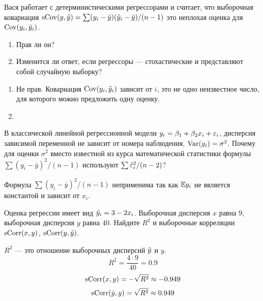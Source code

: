 \begin{problem}
Вася работает с детерминистическими регрессорами и считает, что выборочная ковариация $\operatorname{sCov}(y,\hat{y})=\sum (y_i-\bar{y})(\hat{y}_i-\bar{y}) /(n-1)$ это неплохая оценка для $\operatorname{Cov}(y_i,\hat{y}_i)$.

\begin{enumerate}
\item Прав ли он?
\item Изменится ли ответ, если регрессоры — стохастические и представляют собой случайную выборку?
\end{enumerate}

\begin{sol}
\begin{enumerate}
\item Не прав. Ковариация $\operatorname{Cov}(y_i,\hat{y}_i)$ зависит от $i$, это не одно неизвестное число, для которого можно предложить одну оценку.
\item
\end{enumerate}
\end{sol}
\end{problem}



\begin{problem}
В классической линейной регрессионной модели $y_i=\beta_1+\beta_2 x_i+\varepsilon_i$, дисперсия зависимой переменной не зависит от номера наблюдения, $\operatorname{Var}(y_i)=\sigma^2$. Почему для оценки $\sigma^2$ вместо известной из курса математической статистики формулы $\sum (y_i-\bar{y})^2/(n-1)$ используют $\sum \hat{\varepsilon}_i^2/(n-2)$?


\begin{sol}
Формула $\sum (y_i-\bar{y})^2/(n-1)$ неприменима так как \(\mathbb{E} y_i\) не является константой и зависит от \(x_i\).
\end{sol}
\end{problem}




\begin{problem}
Оценка регрессии имеет вид $\hat{y}_i=3-2x_i$. Выборочная дисперсия $x$ равна $9$, выборочная дисперсия $y$ равна $40$. Найдите $R^2$ и выборочные корреляции $\operatorname{sCorr}(x,y)$, $\operatorname{sCorr}(y,\hat{y})$.


\begin{sol}
\(R^2\) — это отношение выборочных дисперсий \(\hat{y}\) и \(y\).
\[R^2 = \frac{4 \cdot 9}{40} = 0.9 \]
\[\operatorname{sCorr}(x, y) = -\sqrt{R^2} \approx - 0.949  \]
\[\operatorname{sCorr}(\hat{y}, y) = \sqrt{R^2} \approx  0.949  \]
\end{sol}
\end{problem}




